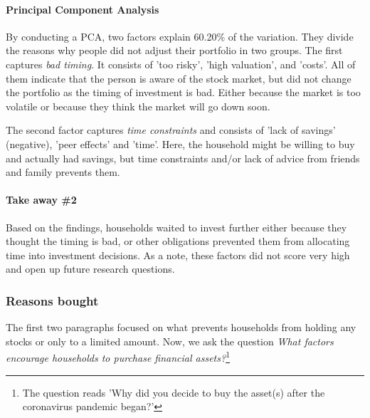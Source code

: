 \documentclass[ProjectABM]{subfiles}
\begin{document}

\paragraph{Principal Component Analysis}
By conducting a PCA, two factors explain 60.20\% of the variation. They divide the reasons why people did not adjust their portfolio in two groups. The first captures \textit{bad timing}. It consists of 'too risky', 'high valuation', and 'costs'. All of them indicate that the person is aware of the stock market, but did not change the portfolio as the timing of investment is bad. Either because the market is too volatile or because they think the market will go down soon.

The second factor captures \textit{time constraints} and consists of 'lack of savings' (negative), 'peer effects' and 'time'. Here, the household might be willing to buy and actually had savings, but time constraints and/or lack of advice from friends and family prevents them.




\paragraph{Take away \#2}
Based on the findings, households waited to invest further either because they thought the timing is bad, or other obligations prevented them from allocating time into investment decisions. As a note, these factors did not score very high and open up future research questions.

\subsubsection{Reasons bought}
The first two paragraphs focused on what prevents households from holding any stocks or only to a limited amount. Now, we ask the question \textit{What factors encourage households to purchase financial assets?}\footnote{The question reads 'Why did you decide to buy the asset(s) after the coronavirus pandemic began?'}
\end{document}

